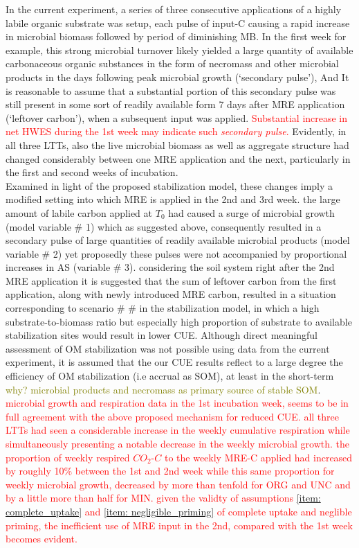 \documentclass[12pt]{report}
\newcommand{\myRed}[1]{\textcolor{red}{#1}} %
\newcommand{\myGreen}[1]{\textcolor{olive}{#1}} %
\begin{document}
			 In the current experiment, a series of three consecutive applications of a highly labile organic substrate was setup, each pulse of input-C causing a rapid increase in microbial biomass followed by period of diminishing MB. In the first week for example, this strong microbial turnover likely yielded a large quantity of available carbonaceous organic substances in the form of necromass and other microbial products in the days following peak microbial growth (‘secondary pulse’), And It is reasonable to assume that a substantial portion of this secondary pulse was still present in some sort of readily available form 7 days after MRE application (‘leftover carbon’), when a subsequent input was applied. \myRed{Substantial increase in net HWES during the 1st week may indicate such \textit{secondary pulse}.} Evidently, in all three LTTs, also the live microbial biomass as well as  aggregate structure had changed considerably between one MRE application and the next, particularly in the first and second weeks of incubation.\\
			 Examined in light of the proposed stabilization model, these changes imply a modified setting into which MRE is applied in the 2nd and 3rd week. the large amount of labile carbon applied at $ T_0 $ had caused a surge of microbial growth (model variable \# 1) which as suggested above, consequently resulted in a secondary pulse of large quantities of readily available microbial products (model variable \# 2) yet proposedly these pulses were not accompanied by proportional increases in AS (variable \# 3). considering the soil system right after the 2nd MRE application it is suggested that the sum of leftover carbon from the first application, along with newly introduced MRE carbon, resulted in a situation corresponding to scenario \# \# in the stabilization model,  in which a high substrate-to-biomass ratio but especially high proportion of substrate to available stabilization sites would result in lower CUE. Although direct meaningful  assessment of OM stabilization was not possible using data from the current experiment, it is assumed that the our CUE results reflect to a large degree the efficiency of OM stabilization (i.e accrual as SOM), at least in the short-term \myGreen{why? microbial products and necromass as primary source of stable SOM}.\\
			 \myRed{microbial growth and respiration data in the 1st incubation week, seems to be in full agreement with the above proposed mechanism for reduced CUE. all three LTTs had seen a considerable increase in the weekly cumulative respiration while simultaneously presenting a notable decrease in the weekly microbial growth. the proportion of weekly respired $ CO_2 $-$ C $ to the weekly MRE-C applied had increased by roughly 10\% between the 1st and 2nd week while this same proportion for weekly microbial growth, decreased by more than tenfold for ORG and UNC and by a little more than half for MIN. given the validty of assumptions \ref{item: complete_uptake} and \ref{item: negligible_priming} of complete uptake and neglible priming, the inefficient use of MRE input in the 2nd, compared with the 1st week becomes evident.} \\
\end{document}
